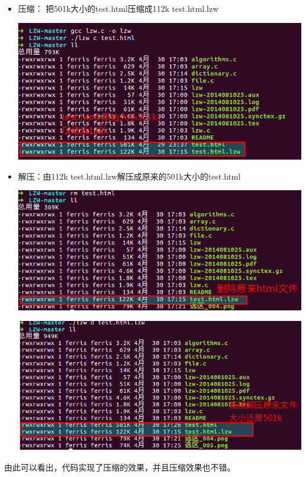 \documentclass[11pt]{ctexart} %
\begin{document}
\subsubsection*{}
\begin{itemize}
\item[] 压缩： 把501k大小的test.html压缩成112k test.html.lzw

\includegraphics[width=5in]{pic001}

\item[] 解压：由112k test.html.lzw解压成原来的501k大小的test.html

\includegraphics[width=5in]{pic002}

\includegraphics[width=5in]{pic003}
\end{itemize}
由此可以看出，代码实现了压缩的效果，并且压缩效果也不错。
\end{document}
